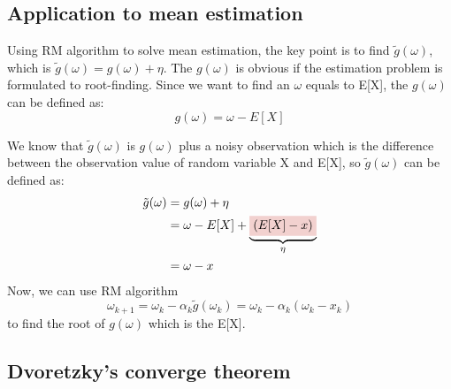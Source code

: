 \subsection{Application to mean estimation}

  Using RM algorithm to solve mean estimation, the key point is to find $\tilde{g}(\omega)$, which is
  $\tilde{g}(\omega)=g(\omega)+\eta$. The $g(\omega)$ is obvious if the estimation problem is formulated to root-finding.
  Since we want to find an $\omega$ equals to E[X], the $g(\omega)$ can be defined as:
  \begin{equation*}
    g(\omega) = \omega - E[X]
  \end{equation*}
  \par We know that $\tilde{g}(\omega)$ is $g(\omega)$ plus a noisy observation which is the difference between the
  observation value of random variable X and E[X], so $\tilde{g}(\omega)$ can be defined as:
  \begin{align*}
    \tilde{g}(\omega) & = g(\omega) + \eta                                                            \\
                      & = \omega - E[X] + \underbrace{\colorbox{myred!20!white}{$(E[X] - x)$}}_{\eta} \\
                      & = \omega - x
  \end{align*}
  Now, we can use RM algorithm
  \begin{equation*}
    \omega_{k+1} = \omega_{k} - \alpha_{k}\tilde{g}(\omega_{k}) = \omega_{k} - \alpha_{k}(\omega_{k}-x_{k})
  \end{equation*}
  to find the root of $g(\omega)$ which is the E[X]. 

\subsection{Dvoretzky's converge theorem}

